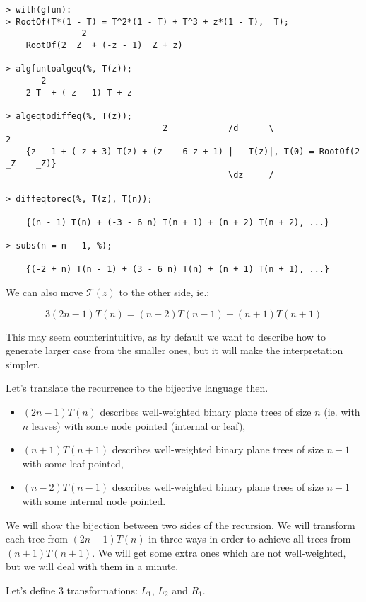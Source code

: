 \documentclass[final]{article}
\theoremstyle{definition}
\theoremstyle{remark}
\newcommand{\gf}[1]{\ensuremath{\mathcal{#1}}}
\begin{document}
\begin{lstlisting}
> with(gfun):
> RootOf(T*(1 - T) = T^2*(1 - T) + T^3 + z*(1 - T),  T);
               2
    RootOf(2 _Z  + (-z - 1) _Z + z)

> algfuntoalgeq(%, T(z));
       2
    2 T  + (-z - 1) T + z

> algeqtodiffeq(%, T(z));
                               2            /d      \                    2
    {z - 1 + (-z + 3) T(z) + (z  - 6 z + 1) |-- T(z)|, T(0) = RootOf(2 _Z  - _Z)}
                                            \dz     /

> diffeqtorec(%, T(z), T(n));

    {(n - 1) T(n) + (-3 - 6 n) T(n + 1) + (n + 2) T(n + 2), ...}

> subs(n = n - 1, %);

    {(-2 + n) T(n - 1) + (3 - 6 n) T(n) + (n + 1) T(n + 1), ...}
\end{lstlisting}

We can also move \(\gf{T}(z)\) to the other side, ie.:

\[3 (2 n - 1) T(n) = (n - 2) T(n - 1) + (n + 1) T(n + 1)\]

This may seem counterintuitive, as by default we want to describe how to generate larger case from the smaller ones, but it will make the interpretation simpler.

Let's translate the recurrence to the bijective language then.
\begin{itemize}
    \item \((2 n - 1) T(n)\) describes well-weighted binary plane trees of size \(n\) (ie. with \(n\) leaves) with some node pointed (internal or leaf),
    \item \((n + 1) T(n + 1)\) describes well-weighted binary plane trees of size \(n - 1\) with some leaf pointed,
    \item \((n - 2) T(n - 1)\) describes well-weighted binary plane trees of size \(n - 1\) with some internal node pointed.
\end{itemize}

We will show the bijection between two sides of the recursion. We will transform each tree from \((2 n - 1) T(n)\) in three ways in order to achieve all trees from \((n + 1) T(n + 1)\). We will get some extra ones which are not well-weighted, but we will deal with them in a minute.

Let's define 3 transformations: \(L_1\), \(L_2\) and \(R_1\).

\end{document}
